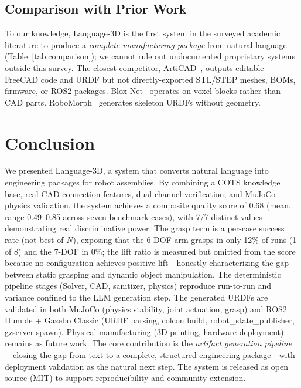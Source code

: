 \documentclass[conference]{IEEEtran}
\begin{document}
\subsection{Comparison with Prior Work}
To our knowledge, Language-3D is the first system in the surveyed academic literature to produce a \emph{complete manufacturing package} from natural language (Table~\ref{tab:comparison}); we cannot rule out undocumented proprietary systems outside this survey. The closest competitor, ArtiCAD~\cite{articad2026}, outputs editable FreeCAD code and URDF but not directly-exported STL/STEP meshes, BOMs, firmware, or ROS2 packages. Blox-Net~\cite{bloxnet2025} operates on voxel blocks rather than CAD parts. RoboMorph~\cite{robomorph2024} generates skeleton URDFs without geometry.

\section{Conclusion}
We presented Language-3D, a system that converts natural language into engineering packages for robot assemblies. By combining a COTS knowledge base, real CAD connection features, dual-channel verification, and MuJoCo physics validation, the system achieves a composite quality score of 0.68 (mean, range 0.49--0.85 across seven benchmark cases), with 7/7 distinct values demonstrating real discriminative power. The grasp term is a per-case success rate (not best-of-$N$), exposing that the 6-DOF arm grasps in only 12\% of runs (1 of 8) and the 7-DOF in 0\%; the lift ratio is measured but omitted from the score because no configuration achieves positive lift---honestly characterizing the gap between static grasping and dynamic object manipulation. The deterministic pipeline stages (Solver, CAD, sanitizer, physics) reproduce run-to-run and variance confined to the LLM generation step. The generated URDFs are validated in both MuJoCo (physics stability, joint actuation, grasp) and ROS2 Humble + Gazebo Classic (URDF parsing, colcon build, robot\_state\_publisher, gzserver spawn). Physical manufacturing (3D printing, hardware deployment) remains as future work. The core contribution is the \emph{artifact generation pipeline}---closing the gap from text to a complete, structured engineering package---with deployment validation as the natural next step. The system is released as open source (MIT) to support reproducibility and community extension.



\end{document}
